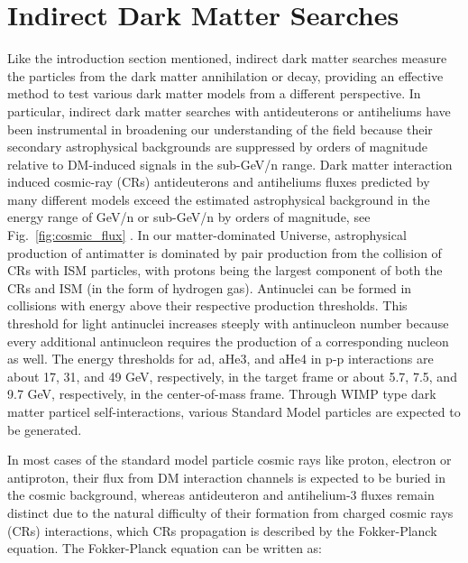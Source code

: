 \section{Indirect Dark Matter Searches}
\label{chap:intro:IDMS}

Like the introduction section mentioned, indirect dark matter searches measure the particles from the dark matter annihilation or decay, providing an effective method to test various dark matter models from a different perspective. In particular, indirect dark matter searches with antideuterons or antiheliums have been instrumental in broadening our understanding of the field because their secondary astrophysical backgrounds are suppressed by orders of magnitude relative to DM-induced signals in the sub-GeV/n range. Dark matter interaction induced cosmic-ray (CRs) antideuterons and antiheliums fluxes predicted by many different models exceed the estimated astrophysical background in the energy range of GeV/n or sub-GeV/n by orders of magnitude, see Fig.~\ref{fig:cosmic_flux} \cite{PhysRevD.102.063004, Doetinchem_2020, PhysRevD.62.043003, Baer_2005, PhysRevD.78.043506, PhysRevD.71.083013, Alejandro_Ibarra_2013,PhysRevD.88.023014, N.Fornengo_2013, PhysRevD.89.103504, PhysRevD.97.103011, Tomassetti:2017DQ, lin2018expectationscosmicantideuteronflux, Ding_2019, 10.1007/jhep082014009, PhysRevD.89.076005, PhysRevD.96.083020}. In our matter-dominated Universe, astrophysical production of antimatter is dominated by pair production from the collision of \ac{CRs} with \ac{ISM} particles, with protons being the largest component of both the \ac{CRs} and \ac{ISM} (in the form of hydrogen gas). Antinuclei can be formed in collisions with energy above their respective production thresholds. This threshold for light antinuclei increases steeply with antinucleon number because every additional antinucleon requires the production of a corresponding nucleon as well. The energy thresholds for \ac{ad}, \ac{aHe3}, and \ac{aHe4} in p-p interactions are about 17, 31, and 49 GeV, respectively, in the target frame or about 5.7, 7.5, and 9.7 GeV, respectively, in the center-of-mass frame. Through \ac{WIMP} type dark matter particel self-interactions, various Standard Model particles are expected to be generated. 

In most cases of the standard model particle cosmic rays like proton, electron or antiproton, their flux from \ac{DM} interaction channels is expected to be buried in the cosmic background, whereas antideuteron and antihelium-3 fluxes remain distinct due to the natural difficulty of their formation from charged cosmic rays (CRs) interactions, which \ac{CRs} propagation is described by the Fokker-Planck equation. The Fokker-Planck equation can be written as:

